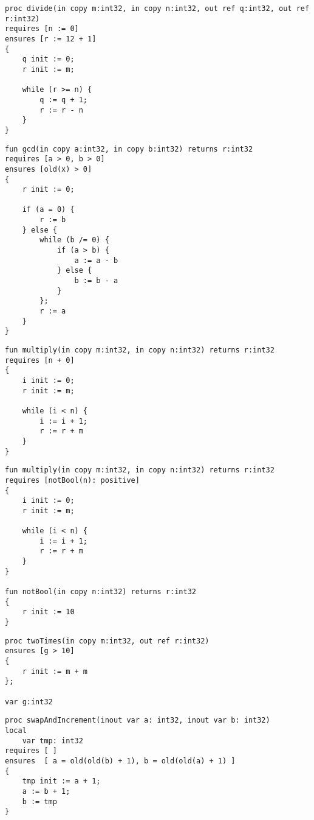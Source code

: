 \begin{lstlisting}[caption=Wert einer Variable in der pre-/postcondition ändern]
proc divide(in copy m:int32, in copy n:int32, out ref q:int32, out ref r:int32)
requires [n := 0]
ensures [r := 12 + 1]
{
    q init := 0;
    r init := m;

    while (r >= n) {
        q := q + 1;
        r := r - n
    }
}
\end{lstlisting}

\begin{lstlisting}[caption=Zugriff auf nicht vorhandene Variable in der old Funktion]
fun gcd(in copy a:int32, in copy b:int32) returns r:int32
requires [a > 0, b > 0]
ensures [old(x) > 0]
{
    r init := 0;
    
    if (a = 0) {
        r := b
    } else {
        while (b /= 0) {
            if (a > b) {
                a := a - b
            } else {
                b := b - a
            }
        };
        r := a
    }
}
\end{lstlisting}

\begin{lstlisting}[caption=Eine nicht Boolsche Expression in der Condition List]
fun multiply(in copy m:int32, in copy n:int32) returns r:int32
requires [n + 0]
{
    i init := 0;
    r init := m;

    while (i < n) {
        i := i + 1;
        r := r + m
    }
}
\end{lstlisting}

\begin{lstlisting}[caption=Eine Funktion in der Condition List welche keinen boolschen Wert zurückliefert]
fun multiply(in copy m:int32, in copy n:int32) returns r:int32
requires [notBool(n): positive]
{
    i init := 0;
    r init := m;

    while (i < n) {
        i := i + 1;
        r := r + m
    }
}

fun notBool(in copy n:int32) returns r:int32
{
    r init := 10
}
\end{lstlisting}

\begin{lstlisting}[caption=Beispiel mit Zugriff auf globale Variable welche nicht in der globalImportList importiert wurde]
proc twoTimes(in copy m:int32, out ref r:int32)
ensures [g > 10]
{
    r init := m + m
};

var g:int32

\end{lstlisting}

\begin{lstlisting}[caption=Auf die Funktion old darf im preexecution State nicht zugegriffen werden.]
proc swapAndIncrement(inout var a: int32, inout var b: int32)
local 
    var tmp: int32
requires [ ]
ensures  [ a = old(old(b) + 1), b = old(old(a) + 1) ]
{
    tmp init := a + 1;
    a := b + 1;
    b := tmp
}

\end{lstlisting}

